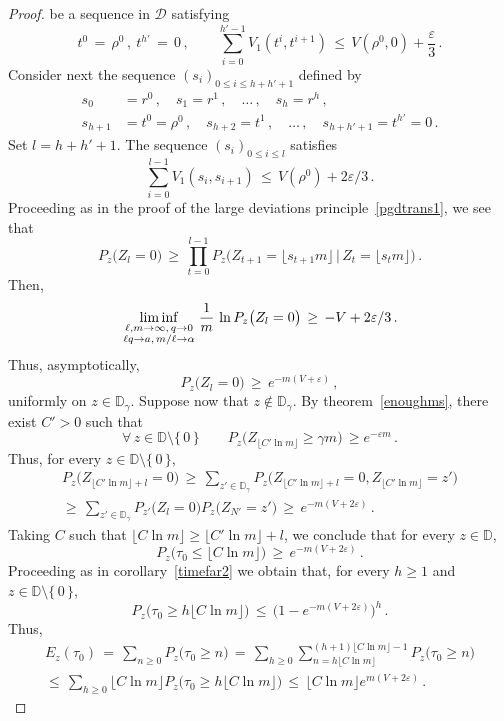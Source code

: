 \documentclass[a4paper,12pt]{article}
\theoremstyle{definition}
\theoremstyle{remark}
\def \cD {\mathcal{D}}
\def \a {\alpha}
\def \g {\gamma}
\def \e {\varepsilon}
\def \dD {\mathbb{D}}
\begin{document}
\begin{proof}
be a sequence in $\cD$ satisfying
$$t^0\,=\,\rho^0\,,\ t^{h'}\,=\,0\,,\qquad
\sum_{i=0}^{h'-1}V_1(t^i,t^{i+1})\,\leq\,V(\rho^0,0)+\frac{\e}{3}\,.$$
Consider next the sequence $(s_i)_{0\leq i\leq h+h'+1}$
defined by
\begin{align*}
s_0&=r^0\,,\quad s_1=r^1\,,\quad\dots\,,\quad s_h=r^h\,,\\
s_{h+1}&=t^0=\rho^0\,,\quad s_{h+2}=t^1\,,\quad\dots\,,\quad s_{h+h'+1}=t^{h'}=0\,.
\end{align*}
Set $l=h+h'+1$. The sequence $(s_i)_{0\leq i\leq l}$ satisfies 
$$\sum_{i=0}^{l-1}V_1(s_i,s_{i+1})\,\leq\,V(\rho^0)+2\e/3\,.$$
Proceeding as in the proof of the large deviations principle~\ref{pgdtrans1},
we see that
$$P_z\big(
Z_{l}=0
\big)\,\geq\,
\prod_{t=0}^{l-1}P_z\big(
Z_{t+1}=\lfloor s_{t+1}m\rfloor\,\big|\,
Z_t=\lfloor s_tm\rfloor\big)\,.
$$
Then,
$$\liminf_{\genfrac{}{}{0pt}{1}{\ell,m\to\infty,\,q\to 0}{\ell q\to a,\,m/\ell\to\a}}\frac{1}{m}\,\ln
P_{z}\big(
Z_{l}=0
\big)\,\geq\,-V+2\e/3\,.$$
Thus, asymptotically,
$$P_{z}\big(
Z_{l}=0
\big)\,\geq\,e^{-m(V+\e)}\,,$$
uniformly on $z\in\dD_\g$.
Suppose now that $z\not\in\dD_\g$.
By theorem~\ref{enoughms}, there exist
$C'>0$ such that
$$\forall\, z\in\dD\setminus\lbrace\,0\,\rbrace\qquad
P_z\big(
Z_{\lfloor C'\ln m\rfloor}\geq \g m
\big)\,\geq e^{-\e m}\,.$$
Thus, for every $z\in\dD\setminus\lbrace\,0\,\rbrace$,
\begin{multline*}
P_z\big(
Z_{\lfloor C'\ln m\rfloor+l}=0
\big)\,
\geq\,
\sum_{z'\in\dD_\g}P_z\big(
Z_{\lfloor C'\ln m\rfloor+l}=0, Z_{\lfloor C'\ln m\rfloor}=z'
\big)\\
\geq\,
\sum_{z'\in\dD_\g}
P_{z'}\big(
Z_l=0
\big)P_z\big(
Z_{N'}=z'
\big)\,\geq\,e^{-m(V+2\e)}\,.
\end{multline*}
Taking $C$ such that $\lfloor C\ln m\rfloor\geq \lfloor C'\ln m\rfloor+l$, we conclude that for every $z\in\dD$,
$$P_z\big(
\tau_0\leq\lfloor C\ln m\rfloor \big)\,\geq\,
e^{-m(V+2\e)}\,.$$
Proceeding as in corollary~\ref{timefar2} we obtain that, for every $h\geq1$ and $z\in\dD\setminus\lbrace\,0\,\rbrace$,
$$
P_z\big(
\tau_0\geq h \lfloor C\ln m\rfloor
\big)\,\leq\,\big(
1-e^{-m(V+2\e)}
\big)^h\,.$$
Thus,
\begin{multline*}
E_z(\tau_0)\,=\,\sum_{n\geq0}P_z\big(
\tau_0\geq n
\big)\,
=\,
\sum_{h\geq 0}\sum_{n=h\lfloor C\ln m\rfloor}^{(h+1)\lfloor C\ln m\rfloor-1}
P_z\big(
\tau_0\geq n
\big)\\
\leq\,\sum_{h\geq0}\lfloor C\ln m\rfloor P_z\big(
\tau_0\geq h \lfloor C\ln m\rfloor
\big)\,
\leq\,
\lfloor C\ln m\rfloor e^{m(V+2\e)}\,.

\end{multline*}
\end{proof}
\end{document}
